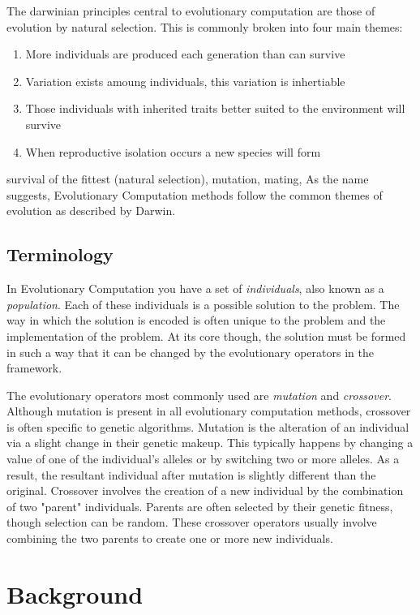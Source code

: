 \documentclass[10pt,letterpaper]{article}
\begin{document}
The darwinian principles central to evolutionary computation are those of evolution by natural selection. This is commonly broken into four main themes:
\begin{enumerate}
\item More individuals are produced each generation than can survive
\item Variation exists amoung individuals, this variation is inhertiable
\item Those individuals with inherited traits better suited to the environment will survive
\item When reproductive isolation occurs a new species will form
\end{enumerate}



survival of the fittest (natural selection), mutation, mating, 
As the name suggests, Evolutionary Computation methods follow the common themes of evolution as described by Darwin. 

\subsection{Terminology}
In Evolutionary Computation you have a set of \textit{individuals}, also known as a \textit{population}. Each of these individuals is a possible solution to the problem. The way in which the solution is encoded is often unique to the problem and the implementation of the problem. At its core though, the solution must be formed in such a way that it can be changed by the evolutionary operators in the framework. 

The evolutionary operators most commonly used are \textit{mutation} and \textit{crossover}. Although mutation is present in all evolutionary computation methods, crossover is often specific to genetic algorithms. Mutation is the alteration of an individual via a slight change in their genetic makeup. This typically happens by changing a value of one of the individual's alleles or by switching two or more alleles. As a result, the resultant individual after mutation is slightly different than the original. Crossover involves the creation of a new individual by the combination of two "parent" individuals. Parents are often selected by their genetic fitness, though selection can be random. These crossover operators usually involve combining the two parents to create one or more new individuals. 


\section{Background}
\end{document}
